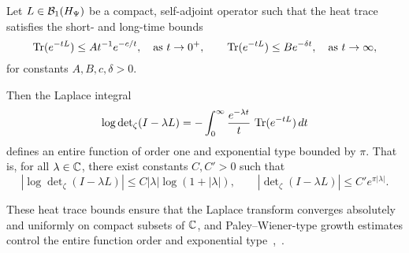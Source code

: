 \begin{lemma}
\label{lem:laplace_preserves_entire_type}
Let \( L \in \mathcal{B}_1(H_{\Psi}) \) be a compact, self-adjoint operator such that the heat trace satisfies the short- and long-time bounds
\[
\operatorname{Tr}(e^{-tL}) \le A t^{-1} e^{-c/t}, \quad \text{as } t \to 0^+,
\qquad
\operatorname{Tr}(e^{-tL}) \le B e^{-\delta t}, \quad \text{as } t \to \infty,
\]
for constants \( A, B, c, \delta > 0 \).

Then the Laplace integral
\[
\log \det\nolimits_\zeta(I - \lambda L)
= - \int_0^\infty \frac{e^{-\lambda t}}{t} \, \operatorname{Tr}(e^{-tL}) \, dt
\]
defines an entire function of order one and exponential type bounded by \( \pi \). That is, for all \( \lambda \in \mathbb{C} \), there exist constants \( C, C' > 0 \) such that
\[
\left| \log \det\nolimits_\zeta(I - \lambda L) \right| \le C |\lambda| \log(1 + |\lambda|),
\qquad
\left| \det\nolimits_\zeta(I - \lambda L) \right| \le C' e^{\pi |\lambda|}.
\]
\end{lemma}

\medskip
\noindent
These heat trace bounds ensure that the Laplace transform converges absolutely and uniformly on compact subsets of \( \mathbb{C} \), and Paley--Wiener-type growth estimates control the entire function order and exponential type~\cite[Ch.~3]{Simon2005TraceIdeals},~\cite[Ch.~9]{Levin1996EntireLectures}.
